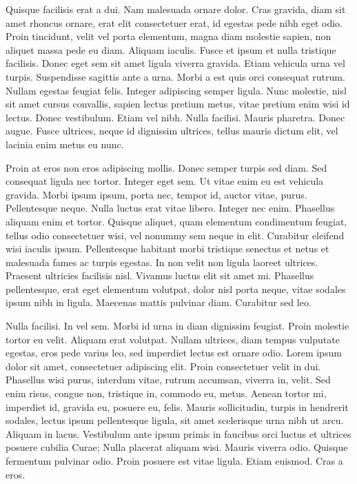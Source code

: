 Quisque facilisis erat a dui. Nam malesuada ornare dolor. Cras gravida, diam
sit amet rhoncus ornare, erat elit consectetuer erat, id egestas pede nibh eget
odio. Proin tincidunt, velit vel porta elementum, magna diam molestie sapien,
non aliquet massa pede eu diam. Aliquam iaculis. Fusce et ipsum et nulla
tristique facilisis. Donec eget sem sit amet ligula viverra gravida. Etiam
vehicula urna vel turpis. Suspendisse sagittis ante a urna. Morbi a est quis
orci consequat rutrum. Nullam egestas feugiat felis. Integer adipiscing semper
ligula. Nunc molestie, nisl sit amet cursus convallis, sapien lectus pretium
metus, vitae pretium enim wisi id lectus. Donec vestibulum. Etiam vel nibh.
Nulla facilisi. Mauris pharetra. Donec augue. Fusce ultrices, neque id
dignissim ultrices, tellus mauris dictum elit, vel lacinia enim metus eu nunc.

Proin at eros non eros adipiscing mollis. Donec semper turpis sed diam. Sed
consequat ligula nec tortor. Integer eget sem. Ut vitae enim eu est vehicula
gravida. Morbi ipsum ipsum, porta nec, tempor id, auctor vitae, purus.
Pellentesque neque. Nulla luctus erat vitae libero. Integer nec enim. Phasellus
aliquam enim et tortor. Quisque aliquet, quam elementum condimentum feugiat,
tellus odio consectetuer wisi, vel nonummy sem neque in elit. Curabitur
eleifend wisi iaculis ipsum. Pellentesque habitant morbi tristique senectus et
netus et malesuada fames ac turpis egestas. In non velit non ligula laoreet
ultrices. Praesent ultricies facilisis nisl. Vivamus luctus elit sit amet mi.
Phasellus pellentesque, erat eget elementum volutpat, dolor nisl porta neque,
vitae sodales ipsum nibh in ligula. Maecenas mattis pulvinar diam. Curabitur
sed leo.

Nulla facilisi. In vel sem. Morbi id urna in diam dignissim feugiat. Proin
molestie tortor eu velit. Aliquam erat volutpat. Nullam ultrices, diam tempus
vulputate egestas, eros pede varius leo, sed imperdiet lectus est ornare odio.
Lorem ipsum dolor sit amet, consectetuer adipiscing elit. Proin consectetuer
velit in dui. Phasellus wisi purus, interdum vitae, rutrum accumsan, viverra
in, velit. Sed enim risus, congue non, tristique in, commodo eu, metus. Aenean
tortor mi, imperdiet id, gravida eu, posuere eu, felis. Mauris sollicitudin,
turpis in hendrerit sodales, lectus ipsum pellentesque ligula, sit amet
scelerisque urna nibh ut arcu. Aliquam in lacus. Vestibulum ante ipsum primis
in faucibus orci luctus et ultrices posuere cubilia Curae; Nulla placerat
aliquam wisi. Mauris viverra odio. Quisque fermentum pulvinar odio. Proin
posuere est vitae ligula. Etiam euismod. Cras a eros.

